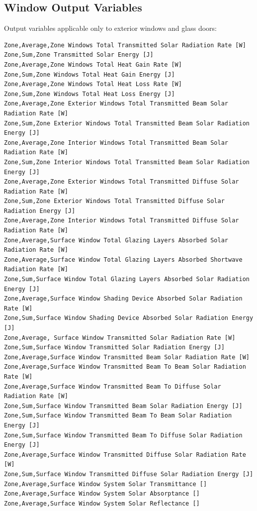 \subsection{Window Output Variables}\label{window-output-variables}

Output variables applicable only to exterior windows and glass doors:

\begin{lstlisting}
Zone,Average,Zone Windows Total Transmitted Solar Radiation Rate [W]
Zone,Sum,Zone Transmitted Solar Energy [J]
Zone,Average,Zone Windows Total Heat Gain Rate [W]
Zone,Sum,Zone Windows Total Heat Gain Energy [J]
Zone,Average,Zone Windows Total Heat Loss Rate [W]
Zone,Sum,Zone Windows Total Heat Loss Energy [J]
Zone,Average,Zone Exterior Windows Total Transmitted Beam Solar Radiation Rate [W]
Zone,Sum,Zone Exterior Windows Total Transmitted Beam Solar Radiation Energy [J]
Zone,Average,Zone Interior Windows Total Transmitted Beam Solar Radiation Rate [W]
Zone,Sum,Zone Interior Windows Total Transmitted Beam Solar Radiation Energy [J]
Zone,Average,Zone Exterior Windows Total Transmitted Diffuse Solar Radiation Rate [W]
Zone,Sum,Zone Exterior Windows Total Transmitted Diffuse Solar Radiation Energy [J]
Zone,Average,Zone Interior Windows Total Transmitted Diffuse Solar Radiation Rate [W]
Zone,Average,Surface Window Total Glazing Layers Absorbed Solar Radiation Rate [W]
Zone,Average,Surface Window Total Glazing Layers Absorbed Shortwave Radiation Rate [W]
Zone,Sum,Surface Window Total Glazing Layers Absorbed Solar Radiation Energy [J]
Zone,Average,Surface Window Shading Device Absorbed Solar Radiation Rate [W]
Zone,Sum,Surface Window Shading Device Absorbed Solar Radiation Energy [J]
Zone,Average, Surface Window Transmitted Solar Radiation Rate [W]
Zone,Sum,Surface Window Transmitted Solar Radiation Energy [J]
Zone,Average,Surface Window Transmitted Beam Solar Radiation Rate [W]
Zone,Average,Surface Window Transmitted Beam To Beam Solar Radiation Rate [W]
Zone,Average,Surface Window Transmitted Beam To Diffuse Solar Radiation Rate [W]
Zone,Sum,Surface Window Transmitted Beam Solar Radiation Energy [J]
Zone,Sum,Surface Window Transmitted Beam To Beam Solar Radiation Energy [J]
Zone,Sum,Surface Window Transmitted Beam To Diffuse Solar Radiation Energy [J]
Zone,Average,Surface Window Transmitted Diffuse Solar Radiation Rate [W]
Zone,Sum,Surface Window Transmitted Diffuse Solar Radiation Energy [J]
Zone,Average,Surface Window System Solar Transmittance []
Zone,Average,Surface Window System Solar Absorptance []
Zone,Average,Surface Window System Solar Reflectance []

\end{lstlisting}

